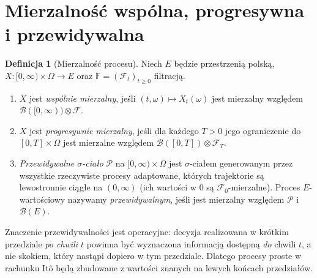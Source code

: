 \documentclass[11pt,a4paper,oneside]{report}
\numberwithin{equation}{chapter}
\theoremstyle{plain}
\theoremstyle{definition}
\newtheorem{definicja}{Definicja}[chapter]
\theoremstyle{remark}
\newcommand{\calF}{\mathcal{F}}
\newcommand{\calB}{\mathcal{B}}
\newcommand{\calP}{\mathcal{P}}
\begin{document}
\section{Mierzalność wspólna, progresywna i przewidywalna}
\begin{definicja}[Mierzalność procesu]
Niech $E$ będzie przestrzenią polską,
$X:[0,\infty)\times\Omega\to E$ oraz
$\mathbb F=(\calF_t)_{t\ge0}$ filtracją.
\begin{enumerate}
\item $X$ jest \emph{wspólnie mierzalny}, jeśli
$(t,\omega)\mapsto X_t(\omega)$ jest mierzalny względem
$\calB([0,\infty))\otimes\calF$.
\item $X$ jest \emph{progresywnie mierzalny}, jeśli dla każdego
$T>0$ jego ograniczenie do $[0,T]\times\Omega$
jest mierzalne względem
$\calB([0,T])\otimes\calF_T$.
\item \emph{Przewidywalne $\sigma$-ciało} $\calP$ na
$[0,\infty)\times\Omega$ jest $\sigma$-ciałem generowanym
przez wszystkie rzeczywiste procesy adaptowane,
których trajektorie są lewostronnie ciągłe na $(0,\infty)$
(ich wartości w $0$ są $\calF_0$-mierzalne).
Proces $E$-wartościowy nazywamy \emph{przewidywalnym},
jeśli jest mierzalny względem $\calP$ i $\calB(E)$.
\end{enumerate}
\end{definicja}

Znaczenie przewidywalności jest operacyjne: decyzja
realizowana w krótkim przedziale \emph{po chwili $t$}
powinna być wyznaczona informacją dostępną \emph{do}
chwili $t$, a nie skokiem, który nastąpi dopiero w tym
przedziale. Dlatego procesy proste w rachunku Itô
będą zbudowane z wartości znanych na lewych końcach
przedziałów.
\end{document}
